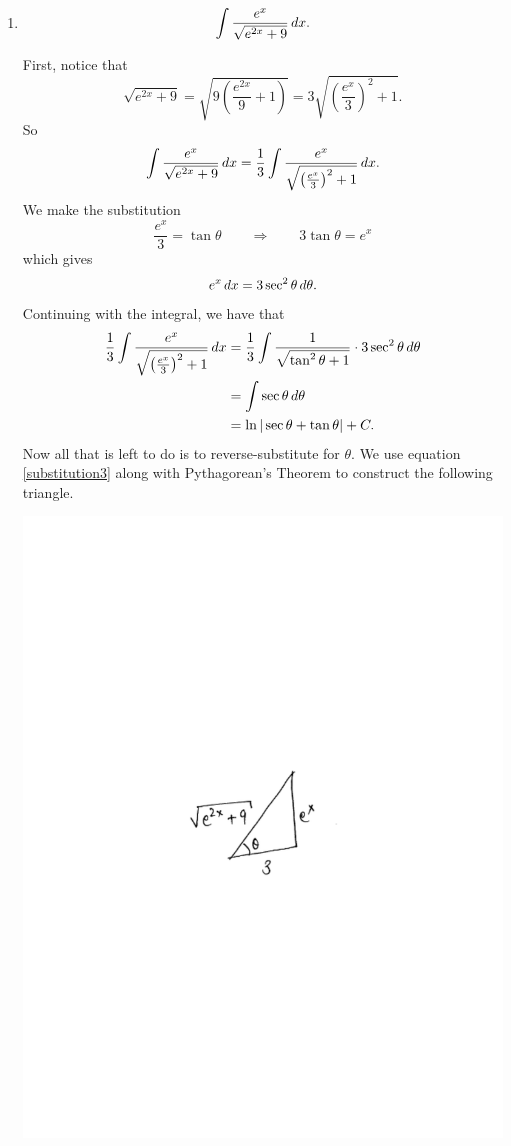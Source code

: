 \documentclass[handout,instructornotes]{ximera}
\begin{document}
\begin{problem}
\begin{enumerate}
	\item 
	\[
	\int \frac{e^x}{\sqrt{e^{2x}+9}} \,d x.
	\]
	\begin{freeResponse}
	First, notice that
		\[
		\sqrt{e^{2x}+9} = \sqrt{9\left( \frac{e^{2x}}{9} + 1 \right)} = 3\sqrt{\left( \frac{e^x}{3} \right)^2 + 1}.
		\]
	So
		\[
		\int \frac{e^x}{\sqrt{e^{2x}+9}} \,d x = \frac{1}{3} \int \frac{e^x}{\sqrt{\left( \frac{e^x}{3} \right)^2 + 1}} \,d x.
		\]
	We make the substitution
		\begin{equation}\label{substitution3}
		\frac{e^x}{3} = \tan \theta 	\qquad	\Longrightarrow	\qquad	3\tan \theta = e^x
		\end{equation}
	which gives
		\[
		e^x \,d x = 3 \sec^2 \theta \,d \theta.
		\]
	Continuing with the integral, we have that
		\begin{align*}
		\frac{1}{3} \int \frac{e^x}{\sqrt{\left( \frac{e^x}{3} \right)^2 + 1}} \,d x
		&= \frac{1}{3} \int \frac{1}{\sqrt{\tan^2 \theta + 1}} \cdot 3 \sec^2 \theta \,d \theta  \\
		&= \int \sec \theta \,d \theta  \\
		&= \ln | \sec \theta + \tan \theta | + C.
		\end{align*}
	Now all that is left to do is to reverse-substitute for $\theta$. 
	We use equation \eqref{substitution3} along with Pythagorean's Theorem to construct the following triangle.
	
		\begin{image}
		\includegraphics[trim= 270 350 250 330]{Figure7-4-3.pdf}
		\end{image}
		

\end{freeResponse}
\end{enumerate}
\end{problem}
\end{document}
